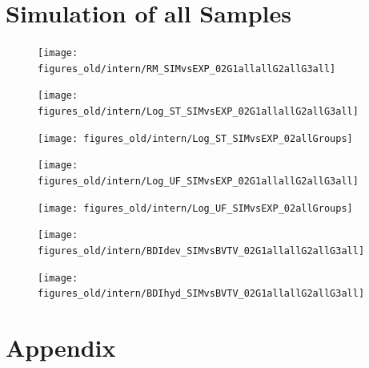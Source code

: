 \documentclass[12pt, a4paper, twoside]{report}
\begin{document}
\chapter{Simulation of all Samples}
%
\begin{figure}[H]
\centering 
\label{sublable2}\texttt{[image: figures\_old/intern/RM\_SIMvsEXP\_02G1allallG2allG3all]}
\label{fig:New_Imp}
\end{figure}
%
\begin{figure}[H]
\centering 
\label{sublable2}\texttt{[image: figures\_old/intern/Log\_ST\_SIMvsEXP\_02G1allallG2allG3all]}
\label{fig:New_Imp}
\end{figure}
%
\begin{figure}[H]
\centering 
\label{sublable2}\texttt{[image: figures\_old/intern/Log\_ST\_SIMvsEXP\_02allGroups]}
\label{fig:New_Imp}
\end{figure}
%
\begin{figure}[H]
\centering 
\label{sublable2}\texttt{[image: figures\_old/intern/Log\_UF\_SIMvsEXP\_02G1allallG2allG3all]}
\label{fig:New_Imp}
\end{figure}
%
\begin{figure}[H]
\centering 
\label{sublable2}\texttt{[image: figures\_old/intern/Log\_UF\_SIMvsEXP\_02allGroups]}
\label{fig:New_Imp}
\end{figure}
%
\begin{figure}[H]
\centering 
\label{sublable2}\texttt{[image: figures\_old/intern/BDIdev\_SIMvsBVTV\_02G1allallG2allG3all]}
\label{fig:New_Imp}
\end{figure}
%
\begin{figure}[H]
\centering 
\label{sublable2}\texttt{[image: figures\_old/intern/BDIhyd\_SIMvsBVTV\_02G1allallG2allG3all]}
\label{fig:New_Imp}
\end{figure}
%
\appendix
\chapter{Appendix}
\newpage
\end{document}
